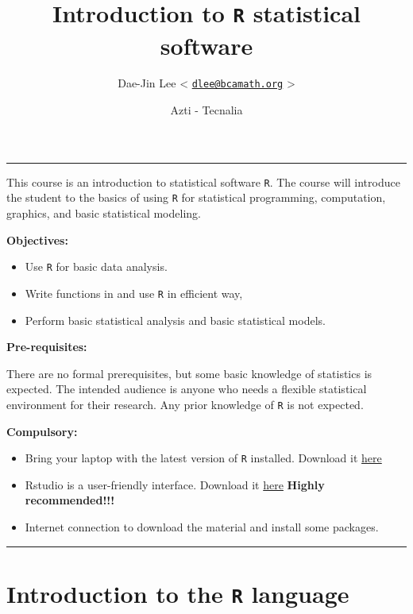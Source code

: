 \documentclass[]{article}
\title{\textbf{Introduction to \texttt{R} statistical software}\\\vspace{0.5em}{\large BCAM - Basque Center for Applied Mathematics, Applied Statistics}}
\author{Dae-Jin Lee \textless{}
\href{mailto:dlee@bcamath.org}{\nolinkurl{dlee@bcamath.org}}
\textgreater{}}
\date{Azti - Tecnalia}
\def\tightlist{}
\numberwithin{equation}{section}
\begin{document}
\maketitle

{
\hypersetup{linkcolor=black}
\setcounter{tocdepth}{2}
\tableofcontents
}
\begin{center}\rule{0.5\linewidth}{\linethickness}\end{center}

This course is an introduction to statistical software \texttt{R}. The
course will introduce the student to the basics of using \texttt{R} for
statistical programming, computation, graphics, and basic statistical
modeling.

\textbf{Objectives:}

\begin{itemize}
\tightlist
\item
  Use \texttt{R} for basic data analysis.
\item
  Write functions in and use \texttt{R} in efficient way,
\item
  Perform basic statistical analysis and basic statistical models.
\end{itemize}

\textbf{Pre-requisites:}

There are no formal prerequisites, but some basic knowledge of
statistics is expected. The intended audience is anyone who needs a
flexible statistical environment for their research. Any prior knowledge
of \texttt{R} is not expected.

\textbf{Compulsory:}

\begin{itemize}
\tightlist
\item
  Bring your laptop with the latest version of \texttt{R} installed.
  Download it \href{https://cran.r-project.org/}{here}
\item
  Rstudio is a user-friendly interface. Download it
  \href{https://www.rstudio.com/products/rstudio/download/}{here}
  \textbf{Highly recommended!!!}
\item
  Internet connection to download the material and install some
  packages.
\end{itemize}

\begin{center}\rule{0.5\linewidth}{\linethickness}\end{center}

\section{\texorpdfstring{Introduction to the \texttt{R}
language}{Introduction to the R language}}\label{introduction-to-the-r-language}
\end{document}
